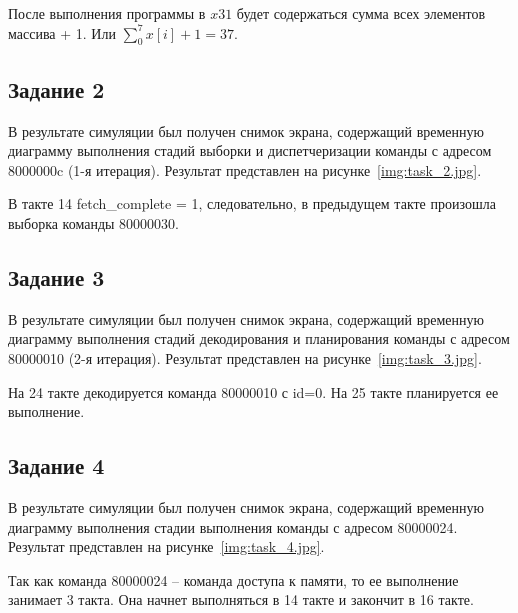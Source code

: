После выполнения программы в $x31$ будет содержаться сумма всех элементов массива + 1. Или $\sum_{0}^{7} x[i] + 1 = 37$.

\subsection{Задание 2}

В результате симуляции был получен снимок экрана, содержащий временную диаграмму выполнения стадий выборки и диспетчеризации команды с адресом 8000000c (1-я итерация). Результат представлен на рисунке~\ref{img:task_2.jpg}.


В такте 14 fetch\_complete = 1, следовательно, в предыдущем такте произошла выборка команды 80000030. 


\subsection{Задание 3}

В результате симуляции был получен снимок экрана, содержащий временную диаграмму выполнения стадий декодирования и планирования команды с адресом 80000010 (2-я итерация). Результат представлен на рисунке~\ref{img:task_3.jpg}.


На 24 такте декодируется команда 80000010 с id=0. На 25 такте планируется ее выполнение. 

\subsection{Задание 4}

В результате симуляции был получен снимок экрана, содержащий временную диаграмму выполнения стадии выполнения команды с адресом 80000024. Результат представлен на рисунке~\ref{img:task_4.jpg}.


Так как команда 80000024 -- команда доступа к памяти, то ее выполнение занимает 3 такта. Она начнет выполняться в 14 такте и закончит в 16 такте.

